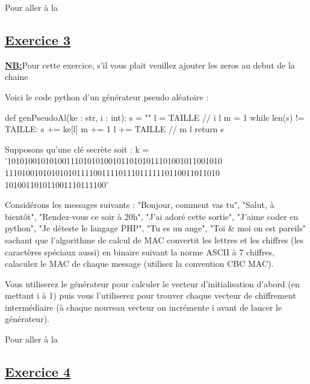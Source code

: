 \par Pour aller à la 


\subsection{\textbf{\underline{Exercice 3}}}
\label{Exo 3}

\textbf{\underline{NB:}}Pour cette exercice, s'il vous plait veuillez ajouter les zeros au debut de la chaine 

Voici le code python d'un générateur pseudo aléatoire :

\begin{Pythoncode}[numbers=left, caption={Python Code}]
def genPseudoAl(ke : str, i : int):
    s = ""
    l = TAILLE // i
    l %
    m = 1
    while len(s) != TAILLE:
        s += ke[l]
        m += 1
        l += TAILLE // m
        l %
    return s
\end{Pythoncode}


Supposons 	qu'une 	clé 	secrète 	soit 	: 	k 	= 
'101010010101001110101010010110101011101001011001010
111010010101010101111001111011101111110110011011010
101001101011001110111100'

Considérons les messages suivants : "Bonjour, comment vas tu", "Salut, à bientôt", "Rendez-vous ce soir à 20h", "J'ai adoré cette sortie", "J'aime coder en python", "Je déteste le langage PHP", "Tu es un ange", "Toi \& moi on est pareils"  sachant que l'algorithme de calcul de MAC convertit les lettres et les chiffres (les caractères spéciaux aussi) en binaire suivant la norme ASCII à 7 chiffres, calaculez le MAC de chaque message (utilisez la convention CBC MAC). 

Vous utiliserez le générateur pour calculer le vecteur d'initialisation d'abord (en mettant i à 1) puis vous l'utiliserez pour trouver chaque vecteur de chiffrement intermédiaire (à chaque nouveau vecteur on incrémente i avant de lancer le générateur).\\

\par Pour aller à la 

\subsection{\textbf{\underline{Exercice 4}}}
\label{Exo 4}

